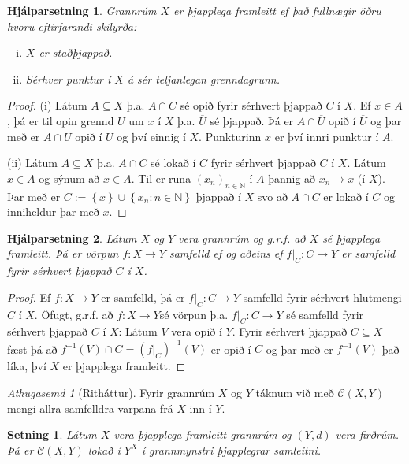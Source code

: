 \documentclass[a4paper,icelandic]{book}
\theoremstyle{definition}
\theoremstyle{plain}
\newtheorem{setn}{Setning}[section]
\newtheorem{hjalparsetn}{Hjálparsetning}[section]
\theoremstyle{remark}
\newtheorem*{ath}{Athugasemd}
\newcommand{\N}{\mathbb{N}} %
\begin{document}
\begin{hjalparsetn}
  \label{hjalp:thjapplega_framleitt.1}
  Grannrúm $X$ er þjapplega framleitt ef það fullnægir öðru hvoru
  eftirfarandi skilyrða:
  \begin{enumerate}[(i)]
    \item $X$ er staðþjappað.
    \item Sérhver punktur í $X$ á sér teljanlegan grenndagrunn. 
  \end{enumerate}
\end{hjalparsetn}
\begin{proof}
  (i) Látum $A\subseteq X$ þ.a. $A\cap C$ sé opið fyrir sérhvert þjappað
  $C$ í $X$. Ef $x\in A$, þá er til opin grennd $U$ um $x$ í $X$ þ.a.
  $\overline U$ sé þjappað. Þá er $A\cap\overline U$ opið í $\overline
  U$ og þar með er $A\cap U$ opið í $U$ og því einnig í $X$. Punkturinn
  $x$ er því innri punktur í $A$.

  (ii) Látum $A\subseteq X$ þ.a. $A\cap C$ sé lokað í $C$ fyrir sérhvert
  þjappað $C$ í $X$. Látum $x\in\overline A$ og sýnum að $x\in A$. Til
  er runa $(x_n)_{n\in\N}$ í $A$ þannig að $x_n\longrightarrow x$ (í
  $X$). Þar með er $C:=\left\{ x \right\}\cup\left\{ x_n:n\in\N
  \right\}$ þjappað í $X$ svo að $A\cap C$ er lokað í $C$ og inniheldur
  þar með $x$. 
\end{proof}
\begin{hjalparsetn}
  \label{hjap:thjapplega_framleitt.2}
  Látum $X$ og $Y$ vera grannrúm og g.r.f. að $X$ sé þjapplega
  framleitt. Þá er vörpun $f:X\to Y$ samfelld \emph{ef og aðeins ef}
  $f|_C:C\to Y$ er samfelld fyrir sérhvert þjappað $C$ í $X$.
\end{hjalparsetn}
\begin{proof}
  Ef $f:X\to Y$ er samfelld, þá er $f|_C:C\to Y$ samfelld fyrir sérhvert
  hlutmengi $C$ í $X$. Öfugt, g.r.f. að $f:X\to Y$sé vörpun þ.a.
  $f|_C:C\to Y$ sé samfelld fyrir sérhvert þjappað $C$ í $X$: Látum $V$
  vera opið í $Y$. Fyrir sérhvert þjappað $C\subseteq X$ fæst þá að
  $f^{-1}(V)\cap C = (f|_C)^{-1}(V)$ er opið í $C$ og þar með er
  $f^{-1}(V)$ það líka, því $X$ er þjapplega framleitt.
\end{proof}
\begin{ath}
  [Ritháttur]
  Fyrir grannrúm $X$ og $Y$ táknum við með $\mathcal C(X,Y)$ mengi allra
  samfelldra varpana frá $X$ inn í $Y$. 
\end{ath}
\begin{setn}
  Látum $X$ vera þjapplega framleitt grannrúm og $(Y,d)$ vera firðrúm.
  Þá er $\mathcal C(X,Y)$ lokað í $Y^X$ í grannmynstri þjapplegrar
  samleitni.
\end{setn}
\end{document}
